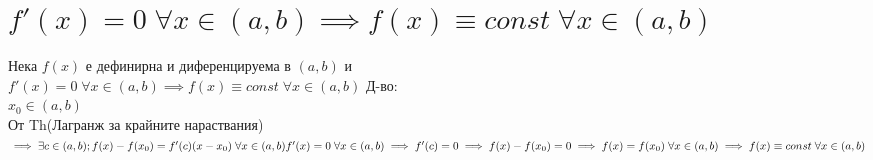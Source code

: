 \documentclass{article}
\begin{document}
    \section{\(f'(x) = 0 \; \forall x \in (a, b) \implies f(x) \equiv const \; \forall x \in (a, b)\)}
    Нека \(f(x)\) е дефинирна и диференцируема в \((a, b)\) и\\
    \(f'(x) = 0 \; \forall x \in (a, b) \implies f(x) \equiv const \; \forall x \in (a, b)\)
    \bigbreak
    Д-во:\\
    \(x_0 \in (a, b)\)\\
    От Th(Лагранж за крайните нараствания)\\
    \(\implies \exists c \in (a, b); f(x) - f(x_0) = f'(c)(x - x_0) \; \forall x \in (a, b)\\
    f'(x) = 0 \; \forall x \in (a, b) \implies f'(c) = 0 \implies f(x) - f(x_0) = 0\\
    \implies f(x) = f(x_0) \; \forall x \in (a, b) \implies f(x) \equiv const \; \forall x \in (a, b)\) 
\end{document}
